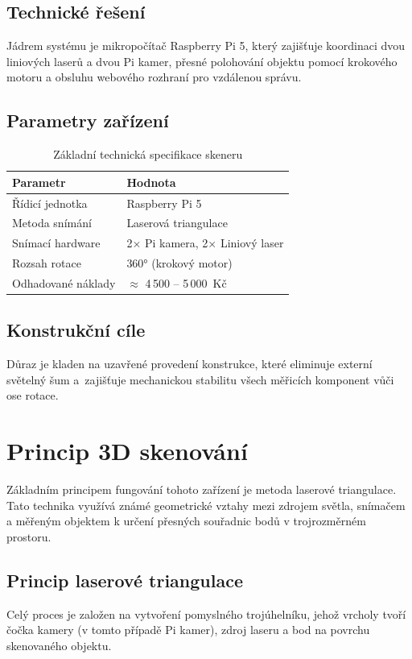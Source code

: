 \documentclass[12pt,a4paper]{report}
\begin{document}
\section{Technické řešení}
Jádrem systému je mikropočítač Raspberry Pi 5, který zajišťuje koordinaci dvou liniových laserů a dvou Pi kamer, přesné polohování objektu pomocí krokového motoru a obsluhu webového rozhraní pro vzdálenou správu.

\section{Parametry zařízení}
\begin{table}[h]
    \centering
    \begin{tabular}{|l|l|}
        \hline
        \textbf{Parametr} & \textbf{Hodnota} \\ \hline
        Řídicí jednotka & Raspberry Pi 5 \\ \hline
        Metoda snímání & Laserová triangulace \\ \hline
        Snímací hardware & 2$\times$ Pi kamera, 2$\times$ Liniový laser \\ \hline
        Rozsah rotace & 360° (krokový motor) \\ \hline
        Odhadované náklady & $\approx$ 4\,500 -- 5\,000~Kč \\ \hline
    \end{tabular}
    \caption{Základní technická specifikace skeneru}
\end{table}

\section{Konstrukční cíle}
Důraz je kladen na uzavřené provedení konstrukce, které eliminuje externí světelný šum \mbox{a zajišťuje} mechanickou stabilitu všech měřicích komponent vůči ose rotace.

\chapter{Princip 3D skenování}
Základním principem fungování tohoto zařízení je metoda laserové triangulace. Tato \mbox{technika} využívá známé geometrické vztahy mezi zdrojem světla, snímačem a měřeným objektem k určení přesných souřadnic bodů v trojrozměrném prostoru.

\section{Princip laserové triangulace}
Celý proces je založen na vytvoření pomyslného trojúhelníku, jehož vrcholy tvoří čočka kamery (v tomto případě Pi kamer), zdroj laseru a bod na povrchu skenovaného objektu. 
\end{document}

